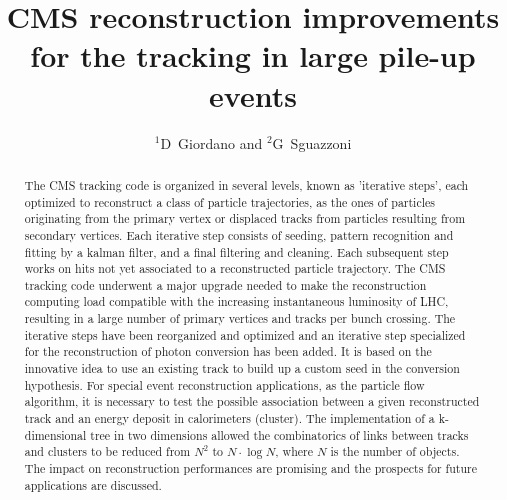 \documentclass[a4paper]{jpconf}
\begin{document}
\title{CMS reconstruction improvements for the tracking in large pile-up events}

\author{$^1$D~Giordano and $^2$G~Sguazzoni}

\address{$^1$CERN, Information Technology Department, Experiment Support Group, Geneva, Switzerland}
\address{$^2$INFN, Firenze, Italy}



\begin{abstract}
The CMS tracking code is organized in several levels, known as
'iterative steps', each optimized to reconstruct a class of particle
trajectories, as the ones of particles originating from the primary
vertex or displaced tracks from particles resulting from secondary
vertices. Each iterative step consists of seeding, pattern recognition
and fitting by a kalman filter, and a final filtering and
cleaning. Each subsequent step works on hits not yet associated to a
reconstructed particle trajectory. The CMS tracking code underwent a
major upgrade needed to make the reconstruction computing load
compatible with the increasing instantaneous luminosity of LHC,
resulting in a large number of primary vertices and tracks per bunch
crossing. The iterative steps have been reorganized and optimized and
an iterative step specialized for the reconstruction of photon
conversion has been added. It is based on the innovative idea to use
an existing track to build up a custom seed in the conversion
hypothesis. For special event reconstruction applications, as the
particle flow algorithm, it is necessary to test the possible
association between a given reconstructed track and an energy deposit
in calorimeters (cluster). The implementation of a k-dimensional tree
in two dimensions allowed the combinatorics of links between tracks
and clusters to be reduced from $N^2$ to $N\cdot\log N$, where $N$ is the number
of objects. The impact on reconstruction performances are promising
and the prospects for future applications are discussed.
\end{abstract}







\end{document}
